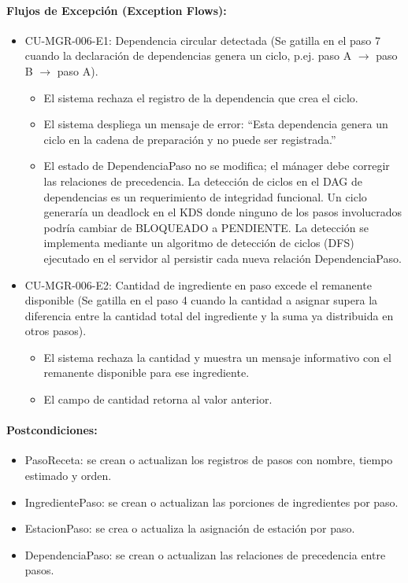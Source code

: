 \paragraph{Flujos de Excepción (Exception Flows):}
\begin{itemize}
    \item CU-MGR-006-E1: Dependencia circular detectada (Se gatilla en el paso 7 cuando la declaración de dependencias genera un ciclo, p.ej. paso A $\rightarrow$ paso B $\rightarrow$ paso A).
    \begin{itemize}
        \item El sistema rechaza el registro de la dependencia que crea el ciclo.
        \item El sistema despliega un mensaje de error: ``Esta dependencia genera un ciclo en la cadena de preparación y no puede ser registrada.''
        \item El estado de DependenciaPaso no se modifica; el mánager debe corregir las relaciones de precedencia. La detección de ciclos en el DAG de dependencias es un requerimiento de integridad funcional. Un ciclo generaría un deadlock en el KDS donde ninguno de los pasos involucrados podría cambiar de BLOQUEADO a PENDIENTE. La detección se implementa mediante un algoritmo de detección de ciclos (DFS) ejecutado en el servidor al persistir cada nueva relación DependenciaPaso.
    \end{itemize}
    \item CU-MGR-006-E2: Cantidad de ingrediente en paso excede el remanente disponible (Se gatilla en el paso 4 cuando la cantidad a asignar supera la diferencia entre la cantidad total del ingrediente y la suma ya distribuida en otros pasos).
    \begin{itemize}
        \item El sistema rechaza la cantidad y muestra un mensaje informativo con el remanente disponible para ese ingrediente.
        \item El campo de cantidad retorna al valor anterior.
    \end{itemize}
\end{itemize}

\paragraph{Postcondiciones:}
\begin{itemize}
    \item PasoReceta: se crean o actualizan los registros de pasos con nombre, tiempo estimado y orden.
    \item IngredientePaso: se crean o actualizan las porciones de ingredientes por paso.
    \item EstacionPaso: se crea o actualiza la asignación de estación por paso.
    \item DependenciaPaso: se crean o actualizan las relaciones de precedencia entre pasos.
\end{itemize}

